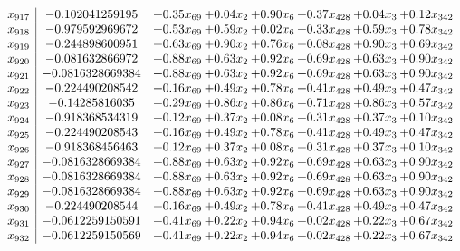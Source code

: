 \documentclass[8pt]{article}
\begin{document}
\[\begin{array}{c| c c@{\hskip 2pt} c@{\hskip 2pt} c@{\hskip 2pt} c@{\hskip 2pt} c@{\hskip 2pt} c@{\hskip 2pt} }
 x_{917}   &  -0.102041259195 & +  0.35 x_{69} & +  0.04 x_{2} & +  0.90 x_{6} & +  0.37 x_{428} & +  0.04 x_{3} & +  0.12 x_{342}\\
 x_{918}   &  -0.979592969672 & +  0.53 x_{69} & +  0.59 x_{2} & +  0.02 x_{6} & +  0.33 x_{428} & +  0.59 x_{3} & +  0.78 x_{342}\\
 x_{919}   &  -0.244898600951 & +  0.63 x_{69} & +  0.90 x_{2} & +  0.76 x_{6} & +  0.08 x_{428} & +  0.90 x_{3} & +  0.69 x_{342}\\
 x_{920}   &  -0.081632866972 & +  0.88 x_{69} & +  0.63 x_{2} & +  0.92 x_{6} & +  0.69 x_{428} & +  0.63 x_{3} & +  0.90 x_{342}\\
 x_{921}   &  -0.0816328669384 & +  0.88 x_{69} & +  0.63 x_{2} & +  0.92 x_{6} & +  0.69 x_{428} & +  0.63 x_{3} & +  0.90 x_{342}\\
 x_{922}   &  -0.224490208542 & +  0.16 x_{69} & +  0.49 x_{2} & +  0.78 x_{6} & +  0.41 x_{428} & +  0.49 x_{3} & +  0.47 x_{342}\\
 x_{923}   &  -0.14285816035 & +  0.29 x_{69} & +  0.86 x_{2} & +  0.86 x_{6} & +  0.71 x_{428} & +  0.86 x_{3} & +  0.57 x_{342}\\
 x_{924}   &  -0.918368534319 & +  0.12 x_{69} & +  0.37 x_{2} & +  0.08 x_{6} & +  0.31 x_{428} & +  0.37 x_{3} & +  0.10 x_{342}\\
 x_{925}   &  -0.224490208543 & +  0.16 x_{69} & +  0.49 x_{2} & +  0.78 x_{6} & +  0.41 x_{428} & +  0.49 x_{3} & +  0.47 x_{342}\\
 x_{926}   &  -0.918368456463 & +  0.12 x_{69} & +  0.37 x_{2} & +  0.08 x_{6} & +  0.31 x_{428} & +  0.37 x_{3} & +  0.10 x_{342}\\
 x_{927}   &  -0.0816328669384 & +  0.88 x_{69} & +  0.63 x_{2} & +  0.92 x_{6} & +  0.69 x_{428} & +  0.63 x_{3} & +  0.90 x_{342}\\
 x_{928}   &  -0.0816328669384 & +  0.88 x_{69} & +  0.63 x_{2} & +  0.92 x_{6} & +  0.69 x_{428} & +  0.63 x_{3} & +  0.90 x_{342}\\
 x_{929}   &  -0.0816328669384 & +  0.88 x_{69} & +  0.63 x_{2} & +  0.92 x_{6} & +  0.69 x_{428} & +  0.63 x_{3} & +  0.90 x_{342}\\
 x_{930}   &  -0.224490208544 & +  0.16 x_{69} & +  0.49 x_{2} & +  0.78 x_{6} & +  0.41 x_{428} & +  0.49 x_{3} & +  0.47 x_{342}\\
 x_{931}   &  -0.0612259150591 & +  0.41 x_{69} & +  0.22 x_{2} & +  0.94 x_{6} & +  0.02 x_{428} & +  0.22 x_{3} & +  0.67 x_{342}\\
 x_{932}   &  -0.0612259150569 & +  0.41 x_{69} & +  0.22 x_{2} & +  0.94 x_{6} & +  0.02 x_{428} & +  0.22 x_{3} & +  0.67 x_{342}\\

\end{array}\]
\end{document}
